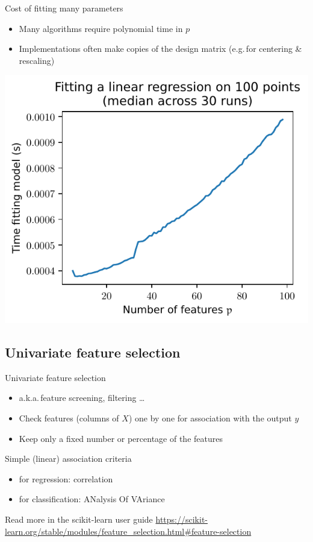 \documentclass[presentation,mathserif,table]{beamer}
\newcommand{\eg}{e.g.\,}
\newcommand{\aka}{a.k.a.\,}
\begin{document}
\begin{frame}[label={sec:org4b43f06}]{Cost of fitting many parameters}
\begin{itemize}
\item Many algorithms require polynomial time in \(p\)
\item Implementations often make copies of the design matrix (\eg for centering \& rescaling)
\end{itemize}
\begin{center}
\includegraphics[height=.7\textheight]{figures/generated/ridge_overfitting/durations.pdf}
\end{center}
\end{frame}
\subsection{Univariate feature selection}
\label{sec:orgb1e48ea}
\begin{frame}[label={sec:org7d5aa73}]{Univariate feature selection}
\begin{itemize}
\item \aka feature screening, filtering \ldots{}
\item Check features (columns of \(X\)) one by one for association with the output \(y\)
\item Keep only a fixed number or percentage of the features
\end{itemize}
\begin{block}{Simple (linear) association criteria}
\begin{itemize}
\item for regression: correlation
\item for classification: ANalysis Of VAriance
\end{itemize}
\end{block}
\begin{block}{Read more in the scikit-learn user guide}
\url{https://scikit-learn.org/stable/modules/feature\_selection.html\#feature-selection}
\end{block}
\end{frame}
\end{document}
